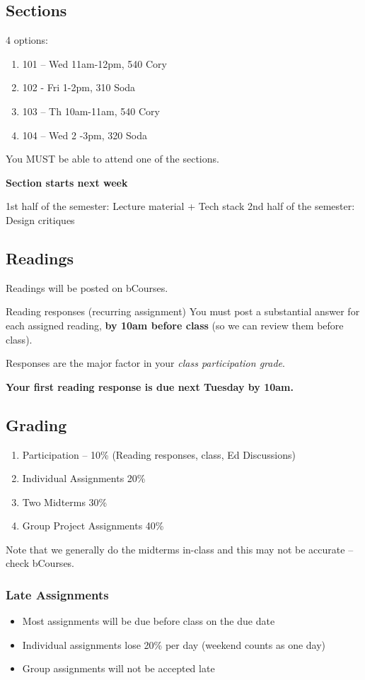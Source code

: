 \subsection{Sections}
4 options: 
\begin{enumerate}
    \item 101 – Wed 11am-12pm, 540 Cory
    \item 102 - Fri 1-2pm, 310 Soda
    \item 103 – Th 10am-11am, 540 Cory
    \item 104 – Wed 2 -3pm, 320 Soda
\end{enumerate}
You MUST be able to attend one of the sections.

\textbf{Section starts next week}

1st half of the semester: Lecture material + Tech stack 
2nd half of the semester: Design critiques

\subsection{Readings}
Readings will be posted on bCourses.

Reading responses (recurring assignment)
You must post a substantial answer for each assigned reading, \textbf{by 10am before class} (so we can review them before class). 

Responses are the major factor in your \textit{class participation grade}.

\textbf{Your first reading response is due next Tuesday by 10am.}

\subsection{Grading}
\begin{enumerate}
    \item Participation – 10\% (Reading responses, class, Ed Discussions)
    \item Individual Assignments 20\%
    \item Two Midterms 30\%
    \item Group Project Assignments 40\%
\end{enumerate}
Note that we generally do the midterms in-class and this may not be accurate -- check bCourses.

\subsubsection{Late Assignments}
\begin{itemize}
    \item Most assignments will be due before class on the due date
    \item Individual assignments lose 20\% per day (weekend counts as one day)
    \item Group assignments will not be accepted late
\end{itemize}
